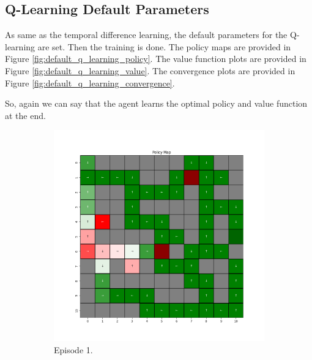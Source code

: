 \documentclass{assignment}
\begin{document}
\subsection{Q-Learning Default Parameters}
As same as the temporal difference learning, the default parameters for the Q-learning are set. Then the training is done. The policy maps are provided  in Figure \ref{fig:default_q_learning_policy}. The value function plots are provided in Figure \ref{fig:default_q_learning_value}. The convergence plots are provided in Figure \ref{fig:default_q_learning_convergence}.

So, again we can say that the agent learns the optimal policy and value function at the end.

\begin{figure}[H]
    \begin{subfigure}{0.3\textwidth}
        \includegraphics[width=\textwidth]{figures/policy_q/default/policy_alpha_0.1_gamma_0.95_epsilon_0.2_iteration_1.png}
    \caption{Episode 1.}
    \end{subfigure}\hfill
    \begin{subfigure}{0.3\textwidth}

\end{subfigure}
\end{figure}
\end{document}
